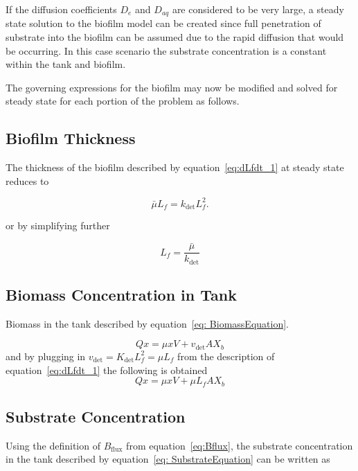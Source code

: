 \documentclass[letterpaper, twoside]{article}
\numberwithin{equation}{section}
\begin{document}
If the diffusion coefficients $D_e$ and $D_{aq}$ are considered to be very large, a steady state solution to the biofilm model can be created since full penetration of substrate into the biofilm can be assumed due to the rapid diffusion that would be occurring. In this case scenario the substrate concentration is a constant within the tank and biofilm.

The governing expressions for the biofilm may now be modified and solved for steady state for each portion of the problem as follows.

\subsection{Biofilm Thickness}
The thickness of the biofilm described by equation~\ref{eq:dLfdt_1} at steady state reduces to 

\begin{equation*}
   {\bar\mu L_f}={k_{\mathrm{det}}L_f^2}.
\end{equation*}
 
 or by simplifying further
 
 \begin{equation}
  \label{eq:Lfsteady}
  {L_f}=\frac{\bar\mu}{k_{\mathrm{det}}}
\end{equation}

\subsection{Biomass Concentration in Tank}
Biomass in the tank described by equation~\ref{eq: BiomassEquation}. 

\begin{equation*} 
  Qx = \mu xV +v_{\mathrm{det}} A X_b
\end{equation*}
and by plugging in $v_{\mathrm{det}}= K_\mathrm{det} L_f^2 = \mu L_f$ from the description of equation~\ref{eq:dLfdt_1} the following is obtained
\begin{equation}
 \label{eq:biomass steady}
  Qx = \mu xV +\mu L_f A X_b
\end{equation}

\subsection{Substrate Concentration}
Using the definition of $B_{\mathrm{flux}}$ from equation~\ref{eq:Bflux}, the substrate concentration in the tank described by equation~\ref{eq: SubstrateEquation} can be written as
\end{document}
